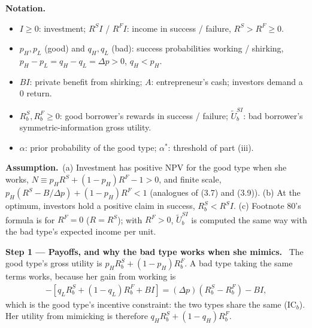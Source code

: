\documentclass[11pt,a4paper]{article}
\newcommand{\notation}{\par\noindent\textbf{Notation.}}
\newcommand{\step}[2]{\par\medskip\noindent\textbf{Step #1 --- #2.}~}
\newcommand{\assume}{\par\smallskip\noindent\textbf{Assumption.}~}
\begin{document}
\notation
\begin{itemize}
  \item $I\ge0$: investment; $R^SI$ / $R^FI$: income in success / failure, $R^S>R^F\ge0$.
  \item $p_H,p_L$ (good) and $q_H,q_L$ (bad): success probabilities working / shirking, $p_H-p_L=q_H-q_L=\Delta p>0$, $q_H<p_H$.
  \item $BI$: private benefit from shirking; $A$: entrepreneur's cash; investors demand a 0 return.
  \item $R_b^S,R_b^F\ge0$: good borrower's rewards in success / failure; $\tilde U_b^{SI}$: bad borrower's symmetric-information gross utility.
  \item $\alpha$: prior probability of the good type; $\alpha^*$: threshold of part (iii).
\end{itemize}

\assume (a) Investment has positive NPV for the good type when she works,
$N\equiv p_HR^S+(1-p_H)R^F-1>0$, and finite scale, $p_H(R^S-B/\Delta p)+(1-p_H)R^F<1$ (analogues of
(3.7) and (3.9)). (b) At the optimum, investors hold a positive claim in success, $R_b^S<R^SI$. (c) Footnote 80's
formula is for $R^F=0$ ($R=R^S$); with $R^F>0$, $\tilde U_b^{SI}$ is computed the same way with the
bad type's expected income per unit.

\step{1}{Payoffs, and why the bad type works when she mimics} The good type's gross utility is
$p_HR_b^S+(1-p_H)R_b^F$. A bad type taking the same terms works, because her gain from working is
\begin{align}
  [q_HR_b^S+(1-q_H)R_b^F]-[q_LR_b^S+(1-q_L)R_b^F+BI]
  = (\Delta p)(R_b^S-R_b^F)-BI, \nonumber
\end{align}
which is the good type's incentive constraint: the two types share the same (IC$_b$). Her utility from
mimicking is therefore $q_HR_b^S+(1-q_H)R_b^F$.
\end{document}
